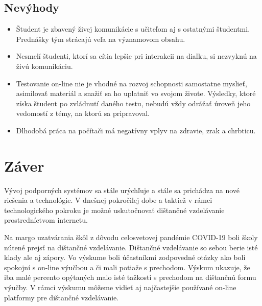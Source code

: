 \documentclass[10pt,oneside,slovak,a4paper]{article}
\begin{document}
\subsection{Nevýhody}
\begin{itemize}
	\item Študent je zbavený živej komunikácie s učiteľom aj s ostatnými študentmi. Prednášky tým strácajú veľa na významovom obsahu.
	\item Nesmelí študenti, ktorí sa cítia lepšie pri interakcii na diaľku, si nezvyknú na živú komunikáciu.
	\item Testovanie on-line nie je vhodné na rozvoj schopnosti samostatne myslieť, asimilovať materiál a snažiť sa ho uplatniť vo svojom živote. Výsledky, ktoré získa študent po zvládnutí daného testu, nebudú vždy odrážať úroveň jeho vedomostí z témy, na ktorú sa pripravoval.
	\item Dlhodobá práca na počítači má negatívny vplyv na zdravie, zrak a chrbticu.
\end{itemize}

\section*{Záver}
Vývoj podporných systémov sa stále urýchľuje a stále sa prichádza na nové riešenia a technológie. V dnešnej pokročilej dobe a taktiež v rámci technologického pokroku je možné uskutočnovať dištančné vzdelávanie prostredníctvom internetu.

Na margo uzatvárania škôl z dôvodu celosvetovej pandémie COVID-19 boli školy nútené prejsť na dištančné vzdelávanie. Dištančné vzdelávanie so sebou berie isté klady ale aj zápory. Vo výskume boli účastníkmi zodpovedné otázky ako boli spokojní s on-line výučbou a či mali potiaže s prechodom.
Výskum ukazuje, že iba malé percento opýtaných malo isté tažkosti s prechodom na dištančnú formu výučby. V rámci výskumu môžeme vidieť aj najčastejšie používané on-line platformy pre dištančné vzdelávanie.
\end{document}
